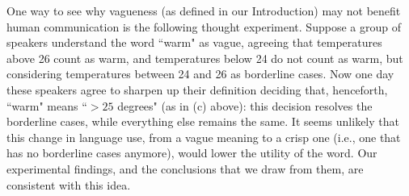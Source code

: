 \documentclass[%
man,		%
floatsintext,%
apacite%
]{apa6} %
\begin{document}
One way to see why vagueness (as defined in our Introduction) may not benefit human communication is the following thought experiment. Suppose a group of speakers understand the word ``warm" as vague, agreeing that temperatures above 26 count as warm, and temperatures below 24 do not count as warm, but considering temperatures between 24 and 26 as borderline cases. Now one day these speakers agree to sharpen up their definition deciding that, henceforth, ``warm" means ``$>25$ degrees" (as in (c) above): this decision resolves the borderline cases, while everything else remains the same. It seems unlikely that this change in language use, from a vague meaning to a crisp one (i.e., one that has no borderline cases anymore), would lower the utility of the word. Our experimental findings,
and the conclusions that we draw from them, are consistent with this idea.

\setcounter{secnumdepth}{0}

\end{document}
